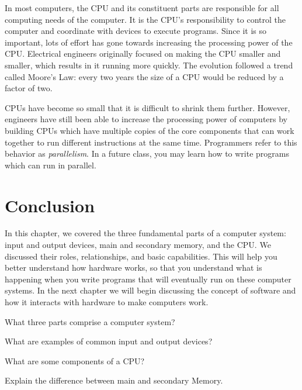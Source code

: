 In most computers, the CPU and its constituent parts are responsible for all computing needs of the computer.  It is the CPU's responsibility to control the computer and coordinate with devices to execute programs. Since it is so important, lots of effort has gone towards increasing the processing power of the CPU. Electrical engineers originally focused on making the CPU smaller and smaller, which results in it running more quickly. The evolution followed a trend called Moore's Law: every two years the size of a CPU would be reduced by a factor of two.

CPUs have become so small that it is difficult to shrink them further. However, engineers have still been able to increase the processing power of computers by building CPUs which have multiple copies of the core components that can work together to run different instructions at the same time. Programmers refer to this behavior as \emph{parallelism}. In a future class, you may learn how to write programs which can run in parallel.


\section {Conclusion}

In this chapter, we covered the three fundamental parts of a computer system: input and output devices, main and secondary memory, and the CPU. We discussed their roles, relationships, and basic capabilities. This will help you better understand how hardware works, so that you understand what is happening when you write programs that will eventually run on these computer systems. In the next chapter we will begin discussing the concept of software and how it interacts with hardware to make computers work.

\exercisesection

\begin{exercise}
What three parts comprise a computer system?
\end{exercise}

\begin{exercise}
What are examples of common input and output devices?
\end{exercise}

\begin{exercise}
What are some components of a CPU?
\end{exercise}

\begin{exercise}
Explain the difference between main and secondary Memory.
\end{exercise}
